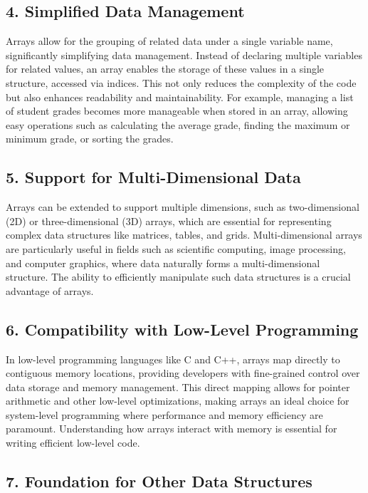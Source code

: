 \documentclass[12pt, oneside]{book}
\begin{document}
\subsection{4. Simplified Data Management}

Arrays allow for the grouping of related data under a single variable name, significantly simplifying data management. Instead of declaring multiple variables for related values, an array enables the storage of these values in a single structure, accessed via indices. This not only reduces the complexity of the code but also enhances readability and maintainability. For example, managing a list of student grades becomes more manageable when stored in an array, allowing easy operations such as calculating the average grade, finding the maximum or minimum grade, or sorting the grades.

\subsection{5. Support for Multi-Dimensional Data}

Arrays can be extended to support multiple dimensions, such as two-dimensional (2D) or three-dimensional (3D) arrays, which are essential for representing complex data structures like matrices, tables, and grids. Multi-dimensional arrays are particularly useful in fields such as scientific computing, image processing, and computer graphics, where data naturally forms a multi-dimensional structure. The ability to efficiently manipulate such data structures is a crucial advantage of arrays.

\subsection{6. Compatibility with Low-Level Programming}

In low-level programming languages like C and C++, arrays map directly to contiguous memory locations, providing developers with fine-grained control over data storage and memory management. This direct mapping allows for pointer arithmetic and other low-level optimizations, making arrays an ideal choice for system-level programming where performance and memory efficiency are paramount. Understanding how arrays interact with memory is essential for writing efficient low-level code.

\subsection{7. Foundation for Other Data Structures}
\end{document}
